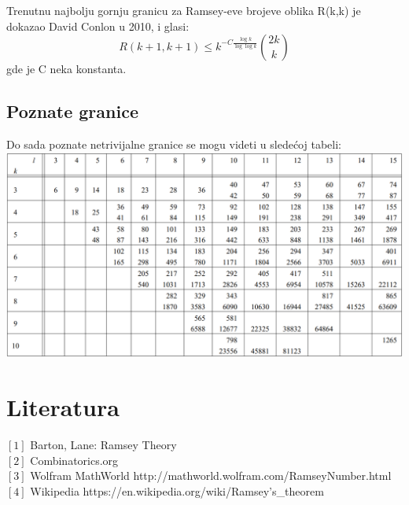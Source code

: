 \documentclass[12pt,a4paper]{article}
\begin{document}
Trenutnu najbolju gornju granicu za Ramsey-eve brojeve oblika R(k,k) je dokazao David Conlon u 2010, i glasi:
\[R(k+1,k+1)\leq k^{-C\frac{\log{k}}{\log{\log{k}}}}\binom{2k}{k}\]
gde je C neka konstanta.
\subsection{Poznate granice}
Do sada poznate netrivijalne granice se mogu videti u sledećoj tabeli:
\vspace{0.5em} \\
\includegraphics[width=\textwidth]{poznateGranice.png} %

\newpage
\section{Literatura}

$[1]$ Barton, Lane: Ramsey Theory\\
$[2]$ Combinatorics.org \\
$[3]$ Wolfram MathWorld http://mathworld.wolfram.com/RamseyNumber.html\\
$[4]$ Wikipedia https://en.wikipedia.org/wiki/Ramsey's\_theorem \\
\end{document}
